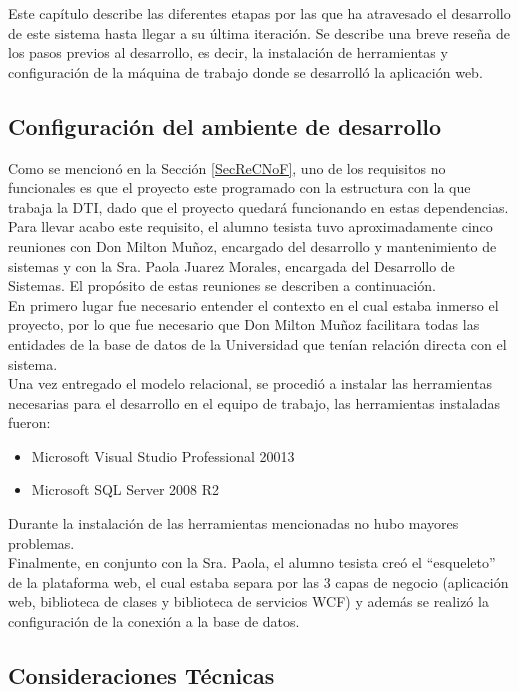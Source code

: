 Este capítulo describe las diferentes etapas por las que ha atravesado el desarrollo de
este sistema hasta llegar a su última iteración. Se describe una breve reseña de los pasos
previos al desarrollo, es decir, la instalación de herramientas y configuración de la máquina
de trabajo donde se desarrolló la aplicación web. 

\subsection{Configuración del ambiente de desarrollo}

Como se mencionó en la Sección \ref{SecReCNoF}, uno de los requisitos no funcionales es que el proyecto este programado con la estructura con la que trabaja la DTI, dado que el proyecto quedará funcionando en estas dependencias. Para llevar acabo este requisito, el alumno tesista tuvo aproximadamente cinco reuniones con Don Milton Muñoz, encargado del desarrollo y mantenimiento de sistemas y con la Sra. Paola Juarez Morales, encargada del Desarrollo de Sistemas. El propósito de estas reuniones se describen a continuación.
\\

En primero lugar fue necesario entender el contexto en el cual estaba inmerso el proyecto, por lo que fue necesario que Don Milton Muñoz facilitara todas las entidades de la base de datos de la Universidad que tenían relación directa con el sistema.
\\

Una vez entregado el modelo relacional, se procedió a instalar las herramientas necesarias para el desarrollo en el equipo de trabajo, las herramientas instaladas fueron:
\begin{itemize}
	\item Microsoft Visual Studio Professional 20013
	\item Microsoft SQL Server 2008 R2
\end{itemize}

Durante la instalación de las herramientas mencionadas no hubo mayores problemas.
\\

Finalmente, en conjunto con la Sra. Paola, el alumno tesista creó el ``esqueleto'' de la plataforma web, el cual estaba separa por las 3 capas de negocio (aplicación web, biblioteca de clases y biblioteca de servicios WCF) y además se realizó la configuración de la conexión a la base de datos.



\subsection{Consideraciones Técnicas}

